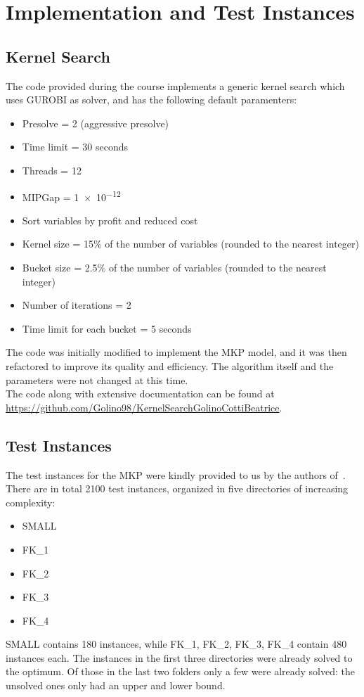 \chapter{Implementation and Test Instances}


\section{Kernel Search}
The code provided during the course implements a generic kernel search
which uses GUROBI as solver, and has the following default paramenters:
\begin{itemize}
    \item Presolve = 2 (aggressive presolve)
    \item Time limit = 30 seconds
    \item Threads = 12
    \item MIPGap = \num{1e-12}
    \item Sort variables by profit and reduced cost
    \item Kernel size = 15\% of the number of variables (rounded to the nearest integer)
    \item Bucket size = 2.5\% of the number of variables (rounded to the nearest integer)
    \item Number of iterations = 2
    \item Time limit for each bucket = 5 seconds
\end{itemize}
The code was initially modified to implement the MKP model, and it was then
refactored to improve its quality and efficiency.
The algorithm itself and the parameters were not changed at this time.\\
The code along with extensive documentation can be found at
\url{https://github.com/Golino98/KernelSearchGolinoCottiBeatrice}.


\section{Test Instances}
The test instances for the MKP were kindly provided to us by the authors of~\cite{mkp:2019}.\\
There are in total 2100 test instances, organized in
five directories of increasing complexity:
\begin{itemize}
    \item SMALL
    \item FK\_1
    \item FK\_2
    \item FK\_3
    \item FK\_4
\end{itemize}
SMALL contains 180 instances, while FK\_1, FK\_2, FK\_3, FK\_4 contain 480 instances each.
The instances in the first three directories were already solved to the optimum.
Of those in the last two folders only a few were already solved: the unsolved
ones only had an upper and lower bound.

